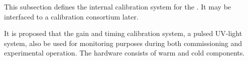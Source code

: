 





This subsection defines the internal calibration system for the \single {}. It may be interfaced to a calibration consortium later.

It is proposed that the \single {} gain and timing calibration system, a pulsed UV-light system, also be used for  monitoring purposes during both commissioning and experimental operation. The hardware consists of warm and cold components.  

